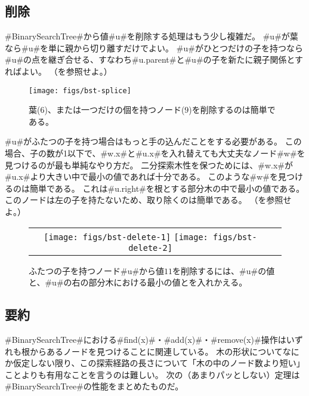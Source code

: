 \subsection{削除}

#BinarySearchTree#から値#u#を削除する処理はもう少し複雑だ。
#u#が葉なら#u#を単に親から切り離すだけでよい。
#u#がひとつだけの子を持つなら#u#の点を継ぎ合せる、すなわち#u.parent#と#u#の子を新たに親子関係とすればよい。
（を参照せよ。）

\begin{figure}
  \begin{center}
    \texttt{[image: figs/bst-splice]}
  \end{center}
  \caption{葉($6$)、または一つだけの個を持つノード($9$)を削除するのは簡単である。}
\end{figure}

#u#がふたつの子を持つ場合はもっと手の込んだことをする必要がある。
この場合、子の数が1以下で、#w.x#と#u.x#を入れ替えても大丈夫なノード#w#を見つけるのが最も単純なやり方だ。
二分探索木性を保つためには、#w.x#が#u.x#より大きい中で最小の値であれば十分である。
このような#w#を見つけるのは簡単である。
これは#u.right#を根とする部分木の中で最小の値である。
このノードは左の子を持たないため、取り除くのは簡単である。
（を参照せよ。）

\begin{figure}
  \begin{center}
    \begin{tabular}{cc}
    \texttt{[image: figs/bst-delete-1]}
    \texttt{[image: figs/bst-delete-2]}
    \end{tabular}
  \end{center}
  \caption{ふたつの子を持つノード#u#から値$11$を削除するには、#u#の値と、#u#の右の部分木における最小の値とを入れかえる。}
\end{figure}

\subsection{要約}

#BinarySearchTree#における#find(x)#・#add(x)#・#remove(x)#操作はいずれも根からあるノードを見つけることに関連している。
木の形状についてなにか仮定しない限り、この探索経路の長さについて「木の中のノード数より短い」ことよりも有用なことを言うのは難しい。
次の（あまりパッとしない）定理は#BinarySearchTree#の性能をまとめたものだ。


